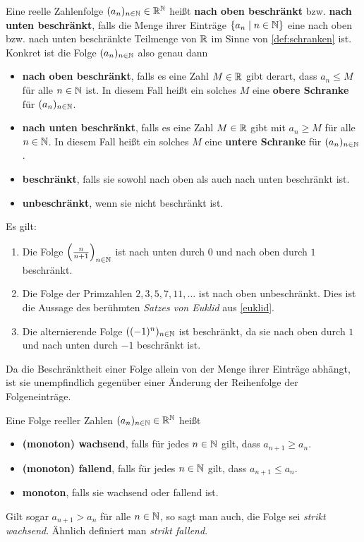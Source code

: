 \begin{defin}[Beschränktheit] 
    Eine reelle Zahlenfolge $(a_n)_{n\in \mathbb N}\in \mathbb R^\mathbb N$ heißt \textbf{nach oben beschränkt} bzw. \textbf{nach unten beschränkt}, falls die Menge ihrer Einträge $\{a_n\mid n\in \mathbb N\}$ eine nach oben bzw. nach unten beschränkte Teilmenge von $\mathbb R$ im Sinne von \cref{def:schranken} ist. Konkret ist die Folge $(a_n)_{n\in \mathbb N}$ also genau dann
    \begin{itemize}
        \item \textbf{nach oben beschränkt}, falls es eine Zahl $M\in \mathbb R$ gibt derart, dass $a_n\le M$ für alle $n\in \mathbb N$ ist. In diesem Fall heißt ein solches $M$ eine \textbf{obere Schranke} für $(a_n)_{n\in \mathbb N}$.
        \item \textbf{nach unten beschränkt}, falls es eine Zahl $M\in \mathbb R$ gibt mit $a_n\ge M$ für alle $n\in \mathbb N$. In diesem Fall heißt ein solches $M$ eine \textbf{untere Schranke} für $(a_n)_{n\in \mathbb N}$.
        \item \textbf{beschränkt}, falls sie sowohl nach oben als auch nach unten beschränkt ist.
        \item \textbf{unbeschränkt}, wenn sie nicht beschränkt ist.
    \end{itemize}
\end{defin}


\begin{bsp} Es gilt:
    \begin{enumerate}
        \item Die Folge $\left(\frac{n}{n+1}\right)_{n\in \mathbb N}$ ist nach unten durch $0$ und nach oben durch $1$ beschränkt.
        \item Die Folge der Primzahlen $2,3,5,7,11,\dots$ ist nach oben unbeschränkt. Dies ist die Aussage des berühmten \emph{Satzes von Euklid} aus \cref{euklid}.
        \item Die alternierende Folge $((-1)^n)_{n\in \mathbb N}$ ist beschränkt, da sie nach oben durch $1$ und nach unten durch $-1$ beschränkt ist.
    \end{enumerate}
    Da die Beschränktheit einer Folge allein von der Menge ihrer Einträge abhängt, ist sie unempfindlich gegenüber einer Änderung der Reihenfolge der Folgeneinträge.
\end{bsp}


\begin{defin}[Monotonie]   
    Eine Folge reeller Zahlen $(a_n)_{n\in \mathbb N}\in \mathbb R^\mathbb N$ heißt
    \begin{itemize}
        \item \textbf{(monoton) wachsend}, falls für jedes $n\in \mathbb N$ gilt, dass $a_{n+1}\ge a_n$.
        \item \textbf{(monoton) fallend}, falls für jedes $n\in \mathbb N$ gilt, dass $a_{n+1}\le a_n$.
        \item \textbf{monoton}, falls sie wachsend oder fallend ist.
    \end{itemize}
    Gilt sogar $a_{n+1}>a_n$ für alle $n\in \mathbb N$, so sagt man auch, die Folge sei \emph{strikt wachsend}. Ähnlich definiert man \emph{strikt fallend}.
\end{defin}


